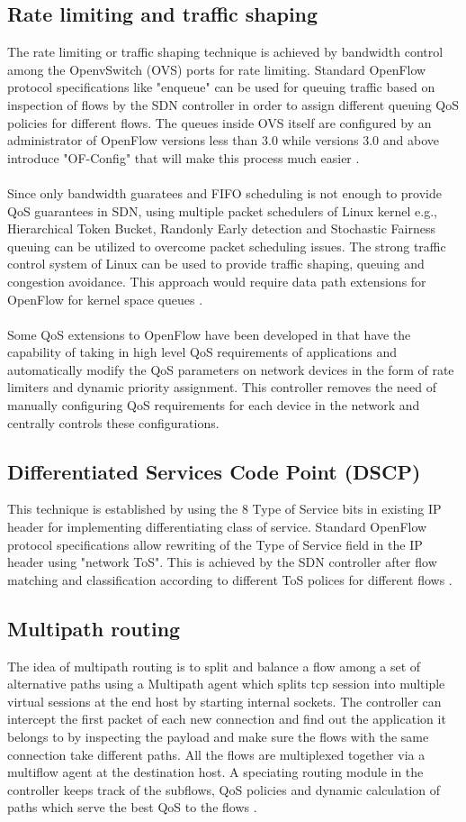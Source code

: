 \documentclass[paper=a4, fontsize=12pt]{scrartcl}	%
\numberwithin{equation}{section}		%
\numberwithin{figure}{section}			%
\numberwithin{table}{section}				%
\begin{document}
\subsection{Rate limiting and traffic shaping}
The rate limiting or traffic shaping technique is achieved by bandwidth control among the OpenvSwitch (OVS) ports for rate limiting. Standard OpenFlow protocol specifications like "enqueue" can be used for queuing traffic based on inspection of flows by the SDN controller in order to assign different queuing QoS policies for different flows. The queues inside OVS itself are configured by an administrator of OpenFlow versions less than 3.0 while versions 3.0 and above introduce "OF-Config" that will make this process much easier \cite{bigswitch}. 
\\
\\
Since only bandwidth guaratees and FIFO scheduling is not enough to provide QoS guarantees in SDN, using multiple packet schedulers of Linux kernel e.g., Hierarchical Token Bucket, Randonly Early detection and Stochastic Fairness queuing can be utilized to overcome packet scheduling issues. The strong traffic control system of Linux can be used to provide traffic shaping, queuing and congestion avoidance. This approach would require data path extensions for OpenFlow for kernel space queues \cite{scheduler}.
\\
\\
Some QoS extensions to OpenFlow have been developed in \cite{convergence} that have the capability of taking in high level QoS requirements of applications and automatically modify the QoS parameters on network devices in the form of rate limiters and dynamic priority assignment. This controller removes the need of manually configuring QoS requirements for each device in the network and centrally controls these configurations. 
\subsection{Differentiated Services Code Point (DSCP)}
This technique is established by using the 8 Type of Service bits in existing IP header for implementing differentiating class of service. Standard OpenFlow protocol specifications allow rewriting of the Type of Service field in the IP header using "network ToS". This is achieved by the SDN controller after flow matching and classification according to different ToS polices for different flows \cite{bigswitch}.
\subsection{Multipath routing}
The idea of multipath routing is to split and balance a flow among a set of alternative paths using a Multipath agent which splits tcp session into multiple virtual sessions at the end host by starting internal sockets. The controller can intercept the first packet of each new connection and find out the application it belongs to by inspecting the payload and make sure the flows with the same connection take different paths. All the flows are multiplexed together via a multiflow agent at the destination host. A speciating routing module in the controller keeps track of the subflows, QoS policies and dynamic calculation of paths which serve the best QoS to the flows \cite{multipath}.
\end{document}
